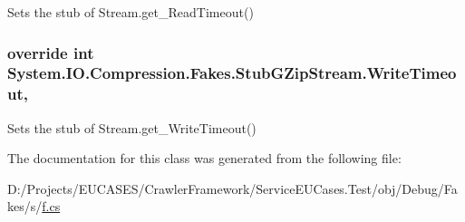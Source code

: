 Sets the stub of Stream.\-get\-\_\-\-Read\-Timeout()

\hypertarget{class_system_1_1_i_o_1_1_compression_1_1_fakes_1_1_stub_g_zip_stream_a795b558e3c37d972ad1ba5aed523795f}{
\subsubsection[{Write\-Timeout}]{\setlength{\rightskip}{0pt plus 5cm}override int System.\-I\-O.\-Compression.\-Fakes.\-Stub\-G\-Zip\-Stream.\-Write\-Timeout\hspace{0.3cm}{\ttfamily [get]}, {\ttfamily [set]}}}\label{class_system_1_1_i_o_1_1_compression_1_1_fakes_1_1_stub_g_zip_stream_a795b558e3c37d972ad1ba5aed523795f}


Sets the stub of Stream.\-get\-\_\-\-Write\-Timeout()



The documentation for this class was generated from the following file\-:\begin{DoxyCompactItemize}
\item 
D\-:/\-Projects/\-E\-U\-C\-A\-S\-E\-S/\-Crawler\-Framework/\-Service\-E\-U\-Cases.\-Test/obj/\-Debug/\-Fakes/s/\hyperlink{s_2f_8cs}{f.\-cs}\end{DoxyCompactItemize}
